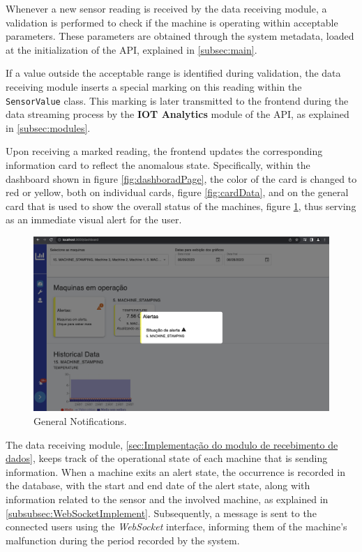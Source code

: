 Whenever a new sensor reading is received by the data receiving module, a validation is performed to check if the machine is operating within acceptable parameters. These parameters are obtained through the system metadata, loaded at the initialization of the \gls{API}, explained in \ref{subsec:main}.

If a value outside the acceptable range is identified during validation, the data receiving module inserts a special marking on this reading within the \texttt{SensorValue} class. This marking is later transmitted to the frontend during the data streaming process by the \textbf{IOT Analytics} module of the \gls{API}, as explained in \ref{subsec:modules}.

Upon receiving a marked reading, the frontend updates the corresponding information card to reflect the anomalous state. Specifically, within the dashboard shown in figure \ref{fig:dashboradPage}, the color of the card is changed to red or yellow, both on individual cards, figure \ref{fig:cardData}, and on the general card that is used to show the overall status of the machines, figure \ref{fig:geralMachineAlert}, thus serving as an immediate visual alert for the user.

\begin{figure}[htbp]
	\centering
	\includegraphics[scale=0.2]{images/geralMachineAlert.png}
	\caption{General Notifications.}
	\label{fig:geralMachineAlert}
\end{figure}

The data receiving module, \ref{sec:Implementação do modulo de recebimento de dados}, keeps track of the operational state of each machine that is sending information. When a machine exits an alert state, the occurrence is recorded in the database, with the start and end date of the alert state, along with information related to the sensor and the involved machine, as explained in \ref{subsubsec:WebSocketImplement}. Subsequently, a message is sent to the connected users using the \textit{WebSocket} interface, informing them of the machine's malfunction during the period recorded by the system.

